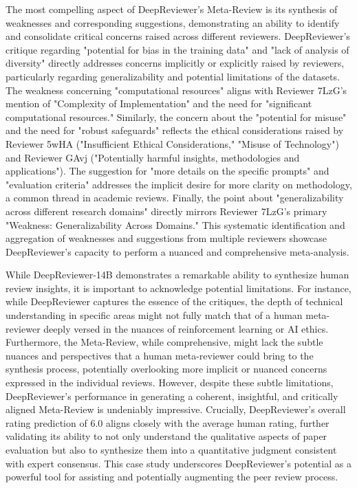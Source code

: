 \documentclass{article}
\begin{document}
The most compelling aspect of DeepReviewer's Meta-Review is its synthesis of weaknesses and corresponding suggestions, demonstrating an ability to identify and consolidate critical concerns raised across different reviewers. DeepReviewer's critique regarding "potential for bias in the training data" and "lack of analysis of diversity" directly addresses concerns implicitly or explicitly raised by reviewers, particularly regarding generalizability and potential limitations of the datasets.  The weakness concerning "computational resources" aligns with Reviewer 7LzG's mention of "Complexity of Implementation" and the need for "significant computational resources."  Similarly, the concern about the "potential for misuse" and the need for "robust safeguards" reflects the ethical considerations raised by Reviewer 5wHA ("Insufficient Ethical Considerations," "Misuse of Technology") and Reviewer GAvj ("Potentially harmful insights, methodologies and applications").  The suggestion for "more details on the specific prompts" and "evaluation criteria" addresses the implicit desire for more clarity on methodology, a common thread in academic reviews.  Finally, the point about "generalizability across different research domains" directly mirrors Reviewer 7LzG's primary "Weakness: Generalizability Across Domains."  This systematic identification and aggregation of weaknesses and suggestions from multiple reviewers showcase DeepReviewer's capacity to perform a nuanced and comprehensive meta-analysis.

While DeepReviewer-14B demonstrates a remarkable ability to synthesize human review insights, it is important to acknowledge potential limitations.  For instance, while DeepReviewer captures the essence of the critiques, the depth of technical understanding in specific areas might not fully match that of a human meta-reviewer deeply versed in the nuances of reinforcement learning or AI ethics.  Furthermore, the Meta-Review, while comprehensive, might lack the subtle nuances and perspectives that a human meta-reviewer could bring to the synthesis process, potentially overlooking more implicit or nuanced concerns expressed in the individual reviews.  However, despite these subtle limitations, DeepReviewer's performance in generating a coherent, insightful, and critically aligned Meta-Review is undeniably impressive.  Crucially, DeepReviewer’s overall rating prediction of 6.0 aligns closely with the average human rating, further validating its ability to not only understand the qualitative aspects of paper evaluation but also to synthesize them into a quantitative judgment consistent with expert consensus. This case study underscores DeepReviewer's potential as a powerful tool for assisting and potentially augmenting the peer review process.
\end{document}

